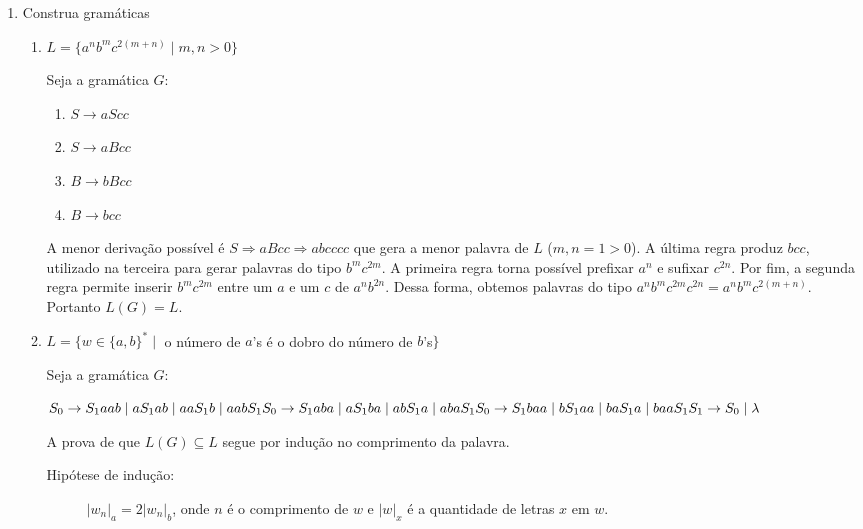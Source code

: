 \documentclass[brazil, a4paper,12pt]{article}
\begin{document}
\begin{enumerate}

\item Construa gramáticas
  \begin{enumerate}
    \item $L = \{a^nb^mc^{2(m+n)} \mid m, n > 0\}$

    Seja a gramática $G$:

    \begin{enumerate}
      \item $S \rightarrow aScc$ \label{regra1a1}
      \item $S \rightarrow aBcc$ \label{regra1a2}
      \item $B \rightarrow bBcc$ \label{regra1a3}
      \item $B \rightarrow bcc$ \label{regra1a4}
    \end{enumerate}

    A menor derivação possível é $S \Rightarrow aBcc \Rightarrow abcccc$ que
    gera a menor palavra de $L$ ($m, n = 1 > 0$). A última regra produz $bcc$,
    utilizado na terceira para gerar palavras do tipo $b^mc^{2m}$. A primeira
    regra torna possível prefixar $a^n$ e sufixar $c^{2n}$. Por fim, a segunda
    regra permite inserir $b^mc^{2m}$ entre um $a$ e um $c$ de $a^nb^{2n}$.
    Dessa forma, obtemos palavras do tipo $a^nb^mc^{2m}c^{2n} =
    a^nb^mc^{2(m+n)}$. Portanto $L(G) = L$.

    \item $L = \{w \in \{a,b\}^* \mid$ o número de $a$'s é o dobro do número de
    $b$'s$\}$

    Seja a gramática $G$:

    $S_0 \rightarrow S_1aab \mid aS_1ab \mid aaS_1b \mid aabS_1 \\
     S_0 \rightarrow S_1aba \mid aS_1ba \mid abS_1a \mid abaS_1 \\
     S_0 \rightarrow S_1baa \mid bS_1aa \mid baS_1a \mid baaS_1 \\
     S_1 \rightarrow S_0 \mid \lambda$

    A prova de que $L(G) \subseteq L$ segue por indução no comprimento da palavra.

    \begin{description}
      \item[Hipótese de indução:] $|w_n|_a = 2|w_n|_b$, onde $n$ é o comprimento de
    $w$ e $|w|_x$ é a quantidade de letras $x$ em $w$.


\end{description}
\end{enumerate}
\end{enumerate}
\end{document}
